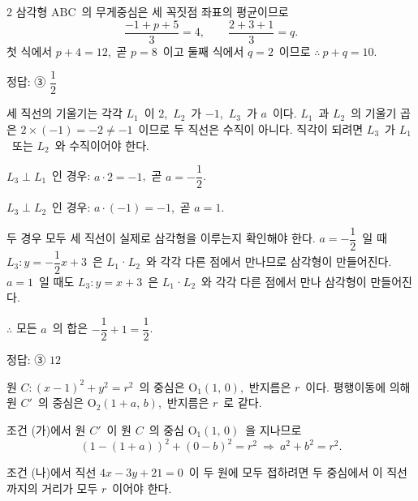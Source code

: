 \documentclass[10pt,fleqn]{article}
\begin{document}
\begin{multicols*}{2}
삼각형 $\mathrm{ABC}$\ 의 무게중심은 세 꼭짓점 좌표의 평균이므로
$$\dfrac{-1 + p + 5}{3} = 4,\qquad \dfrac{2 + 3 + 1}{3} = q.$$
첫 식에서 $p + 4 = 12$,\ 곧 $p = 8$\ 이고 둘째 식에서 $q = 2$\ 이므로 $\therefore\ p + q = 10$.

\begin{dmanswerbox}
정답: ③ $\dfrac{1}{2}$
\end{dmanswerbox}

세 직선의 기울기는 각각 $L_1$\ 이 $2$,\ $L_2$\ 가 $-1$,\ $L_3$\ 가 $a$\ 이다.
$L_1$\ 과 $L_2$\ 의 기울기 곱은 $2 \times (-1) = -2 \neq -1$\ 이므로 두 직선은 수직이 아니다. 직각이 되려면 $L_3$\ 가 $L_1$\ 또는 $L_2$\ 와 수직이어야 한다.

$L_3 \perp L_1$\ 인 경우: $a \cdot 2 = -1$,\ 곧 $a = -\dfrac{1}{2}$.

$L_3 \perp L_2$\ 인 경우: $a \cdot (-1) = -1$,\ 곧 $a = 1$.

두 경우 모두 세 직선이 실제로 삼각형을 이루는지 확인해야 한다. $a = -\dfrac{1}{2}$\ 일 때 $L_3: y = -\dfrac{1}{2}x + 3$\ 은 $L_1$·$L_2$\ 와 각각 다른 점에서 만나므로 삼각형이 만들어진다. $a = 1$\ 일 때도 $L_3: y = x + 3$\ 은 $L_1$·$L_2$\ 와 각각 다른 점에서 만나 삼각형이 만들어진다.

$\therefore$ 모든 $a$\ 의 합은 $-\dfrac{1}{2} + 1 = \dfrac{1}{2}$.

\begin{dmanswerbox}
정답: ③ $12$
\end{dmanswerbox}

원 $C:(x-1)^2 + y^2 = r^2$\ 의 중심은 $\mathrm{O}_1(1,\,0)$,\ 반지름은 $r$\ 이다. 평행이동에 의해 원 $C'$\ 의 중심은 $\mathrm{O}_2(1+a,\,b)$,\ 반지름은 $r$\ 로 같다.

조건 (가)에서 원 $C'$\ 이 원 $C$\ 의 중심 $\mathrm{O}_1(1,\,0)$\ 을 지나므로
\[ (1 - (1+a))^2 + (0 - b)^2 = r^2\ \Longrightarrow\ a^2 + b^2 = r^2. \tag{$\ast$} \]

조건 (나)에서 직선 $4x - 3y + 21 = 0$\ 이 두 원에 모두 접하려면 두 중심에서 이 직선까지의 거리가 모두 $r$\ 이어야 한다.


\end{multicols*}
\end{document}

